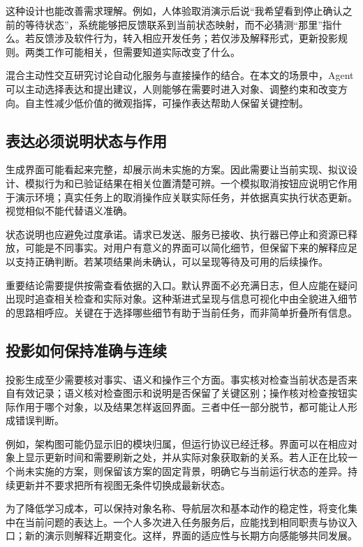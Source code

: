 这种设计也能改善需求理解。例如，人体验取消演示后说“我希望看到停止确认之前的等待状态”，系统能够把反馈联系到当前状态映射，而不必猜测“那里”指什么。若反馈涉及软件行为，转入相应开发任务；若仅涉及解释形式，更新投影规则。两类工作可能相关，但需要知道实际改变了什么。

混合主动性交互研究讨论自动化服务与直接操作的结合\cite{horvitz1999}。在本文的场景中，Agent 可以主动选择表达和提出建议，人则能够在需要时进入对象、调整约束和改变方向。自主性减少低价值的微观指挥，可操作表达帮助人保留关键控制。

\subsection{表达必须说明状态与作用}
生成界面可能看起来完整，却展示尚未实施的方案。因此需要让当前实现、拟议设计、模拟行为和已验证结果在相关位置清楚可辨。一个模拟取消按钮应说明它作用于演示环境；真实任务上的取消操作应关联实际任务，并依据真实执行状态更新。视觉相似不能代替语义准确。

状态说明也应避免过度承诺。请求已发送、服务已接收、执行器已停止和资源已释放，可能是不同事实。对用户有意义的界面可以简化细节，但保留下来的解释应足以支持正确判断。若某项结果尚未确认，可以呈现等待及可用的后续操作。

重要结论需要提供按需查看依据的入口。默认界面不必充满日志，但人应能在疑问出现时追查相关检查和实际对象。这种渐进式呈现与信息可视化中由全貌进入细节的思路相呼应\cite{shneiderman1996}。关键在于选择哪些细节有助于当前任务，而非简单折叠所有信息。

\subsection{投影如何保持准确与连续}
投影生成至少需要核对事实、语义和操作三个方面。事实核对检查当前状态是否来自有效记录；语义核对检查图示和说明是否保留了关键区别；操作核对检查按钮实际作用于哪个对象，以及结果怎样返回界面。三者中任一部分脱节，都可能让人形成错误判断。

例如，架构图可能仍显示旧的模块归属，但运行协议已经迁移。界面可以在相应对象上显示更新时间和需要刷新之处，并从实际对象获取新的关系。若人正在比较一个尚未实施的方案，则保留该方案的固定背景，明确它与当前运行状态的差异。持续更新并不要求把所有视图无条件切换成最新状态。

为了降低学习成本，可以保持对象名称、导航层次和基本动作的稳定性，将变化集中在当前问题的表达上。一个人多次进入任务服务后，应能找到相同职责与协议入口；新的演示则解释近期变化。这样，界面的适应性与长期方向感能够共同发展。

